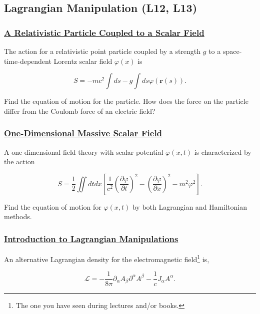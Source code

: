 \subsection{Lagrangian Manipulation (\textbf{L12, L13})}

\subsubsection{\hyperref[A Relativistic Particle Coupled to a Scalar Field]{A Relativistic Particle Coupled to a Scalar Field}}

The action for a relativistic point particle coupled by a strength $g$ to a space-time-dependent Lorentz scalar field $\varphi(x)$ is

\begin{equation}
	S=-m c^{2} \int d s-g \int d s \varphi(\mathbf{r}(s)).
\end{equation}

Find the equation of motion for the particle. How does the force on the particle differ from the Coulomb force of an electric field?

\subsubsection{\hyperref[One-Dimensional Massive Scalar Field]{One-Dimensional Massive Scalar Field}}

A one-dimensional field theory with scalar potential $\varphi(x, t)$ is characterized by the action

\begin{equation}
	S=\frac{1}{2} \iint d t d x\left[\frac{1}{c^{2}}\left(\frac{\partial \varphi}{\partial t}\right)^{2}-\left(\frac{\partial \varphi}{\partial x}\right)^{2}-m^{2} \varphi^{2}\right].
\end{equation}

Find the equation of motion for $\varphi(x, t)$ by both Lagrangian and Hamiltonian methods.


\subsubsection{\hyperref[Introduction to Lagrangian Manipulations]{Introduction to Lagrangian Manipulations}}

An alternative Lagrangian density for the electromagnetic field\footnote{The one you have seen during lectures and/or books.} is,

\begin{equation}\label{alternativelagrangian}
	\mathcal{L} = -\frac{1}{8\pi} \partial_{\alpha} A_{\beta}\partial^{\alpha} A^{\beta} - \frac{1}{c}J_{\alpha}A^{\alpha}.
\end{equation}

